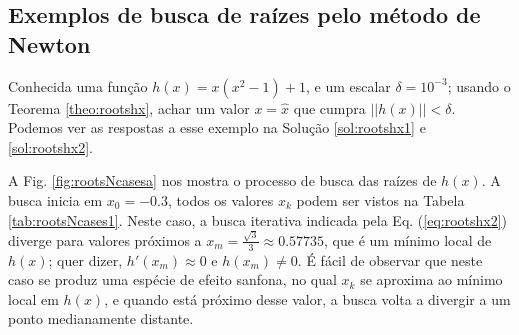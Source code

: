 \newpage
\subsection{Exemplos de busca de raízes pelo método de Newton}


\begin{example}\label{ex:rootshx1}
Conhecida uma função $h(x)=x(x^2-1)+1$, e um escalar $\delta=10^{-3}$;
usando o Teorema \ref{theo:rootshx}, 
achar um valor $x=\hat{x}$ que cumpra $||h(x)||<\delta$.
Podemos ver as respostas a esse exemplo na Solução \ref{sol:rootshx1} e \ref{sol:rootshx2}.
\end{example}
\begin{SolutionT}\label{sol:rootshx1}
 A Fig. \ref{fig:rootsNcasesa} nos mostra o processo de busca das raízes de $h(x)$. 
A busca inicia em $x_0=-0.3$, 
todos os valores $x_{k}$ podem ser vistos na
Tabela \ref{tab:rootsNcases1}. 
Neste caso, a busca iterativa indicada pela Eq. (\ref{eq:rootshx2}) 
diverge para valores próximos a $x_m=\frac{\sqrt{3}}{3}\approx 0.57735$,
que é um mínimo local de $h(x)$; quer dizer, $h'(x_m)\approx 0$ e $h(x_m)\neq 0$.
É fácil de observar que neste caso se produz 
uma espécie de efeito sanfona, no qual $x_{k}$ se aproxima ao mínimo local em $h(x)$, e quando 
está próximo desse valor, a busca volta a divergir a um ponto medianamente distante.
\end{SolutionT}

